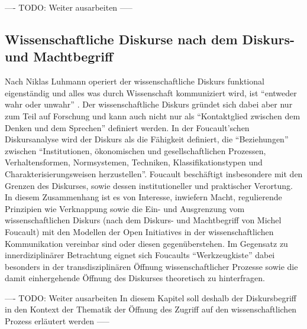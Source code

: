---- TODO: Weiter ausarbeiten -----

\subsection{Wissenschaftliche Diskurse nach dem Diskurs- und Machtbegriff}
Nach Niklas Luhmann operiert der wissenschaftliche Diskurs funktional eigenständig und alles was durch Wissenschaft kommuniziert wird, ist “entweder wahr oder unwahr” \cite{Luhmann1998}. Der wissenschaftliche Diskurs gründet sich dabei aber nur zum Teil auf Forschung und kann auch nicht nur als “Kontaktglied zwischen dem Denken und dem Sprechen” \cite{foucault_ordnung_2003} definiert werden. In der Foucault'schen Diskursanalyse wird der Diskurs als die Fähigkeit definiert, die “Beziehungen” zwischen “Institutionen, ökonomischen und gesellschaftlichen Prozessen, Verhaltensformen, Normsystemen, Techniken, Klassifikationstypen und Charakterisierungsweisen herzustellen”\cite{foucault_archaologie_1981}. Foucault beschäftigt insbesondere mit den Grenzen des Diskurses, sowie dessen institutioneller und praktischer Verortung. In diesem Zusammenhang ist es von Interesse, inwiefern Macht, regulierende Prinzipien wie Verknappung sowie die Ein- und Ausgrenzung vom wissenschaftlichen Diskurs (nach dem Diskurs- und Machtbegriff von Michel Foucault) mit den Modellen der Open Initiatives in der wissenschaftlichen Kommunikation vereinbar sind oder diesen gegenüberstehen. Im Gegensatz zu innerdiziplinärer Betrachtung eignet sich Foucaults “Werkzeugkiste”\cite{Honneth_2003} dabei besonders in der transdisziplinären Öffnung wissenschaftlicher Prozesse sowie die damit einhergehende Öffnung des Diskurses theoretisch zu hinterfragen. 

---- TODO: Weiter ausarbeiten In diesem Kapitel soll deshalb der Diskursbegriff in den Kontext der Thematik der Öffnung des Zugriff auf den wissenschaftlichen Prozess erläutert werden -----
